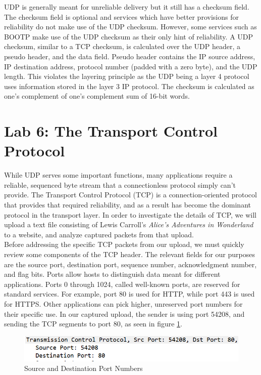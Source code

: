 \documentclass[10pt]{IEEEtran}
\begin{document}
 UDP is generally meant for unreliable delivery but it still has a checksum field. The checksum field is optional and services which have better provisions for reliability do not make use of the UDP checksum. However, some services such as BOOTP make use of the UDP checksum as their only hint of reliability. A UDP checksum, similar to a TCP checksum, is calculated over the UDP header, a pseudo header, and the data field. Pseudo header contains the IP source address, IP destination address, protocol number (padded with a zero byte), and the UDP length. This violates the layering principle as the UDP being a layer 4 protocol uses information stored in the layer 3 IP protocol. The checksum is calculated as one's complement of one's complement sum of 16-bit words. \\
 
\section{Lab 6: The Transport Control Protocol}

 While UDP serves some important functions, many applications require a reliable, sequenced byte stream that a connectionless protocol simply can't provide. The Transport Control Protocol (TCP) is a connection-oriented protocol that provides that required reliability, and as a result has become the dominant protocol in the transport layer. In order to investigate the details of TCP, we will upload a text file consisting of Lewis Carroll's \textit{Alice's Adventures in Wonderland} to a website, and analyze captured packets from that upload.\\
 
 Before addressing the specific TCP packets from our upload, we must quickly review some components of the TCP header. The relevant fields for our purposes are the source port, destination port, sequence number, acknowledgment number, and flag bits. Ports allow hosts to distinguish data meant for different applications. Ports 0 through 1024, called well-known ports, are reserved for standard services. For example, port 80 is used for HTTP, while port 443 is used for HTTPS. Other applications can pick higher, unreserved port numbers for their specific use. In our captured upload, the sender is using port 54208, and sending the TCP segments to port 80, as seen in figure \ref{fig:TCPPortNumbers}.\\
 
  \begin{figure}[h!]
	\includegraphics[width=\linewidth]{portnumbers.png}
	\caption{Source and Destination Port Numbers }
	\label{fig:TCPPortNumbers}
\end{figure}
\end{document}

